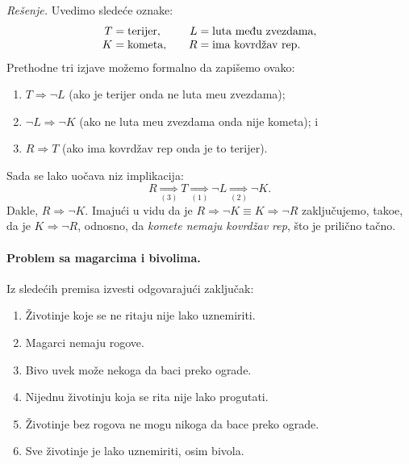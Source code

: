 \noindent
\textit{Re\v senje.}
Uvedimo slede\'ce oznake:
$$
  \begin{array}{r@{\;=\;}l@{\qquad}r@{\;=\;}l}
    T & \text{terijer}, & L & \text{luta me\dj u zvezdama},\\
    K & \text{kometa},  & R & \text{ima kovrd\v zav rep}.
  \end{array}
$$
Prethodne tri izjave mo\v zemo formalno da zapi\v semo ovako:
\begin{enumerate}
\item
  $T \Rightarrow \lnot L$ (ako je terijer onda ne luta me\dj u zvezdama);
\item
  $\lnot L \Rightarrow \lnot K$ (ako ne luta me\dj u zvezdama onda nije kometa); i
\item
  $R \Rightarrow T$ (ako ima kovrd\v zav rep onda je to terijer).
\end{enumerate}
Sada se lako uo\v cava niz implikacija:
$$
  R \underset{(3)}\Rightarrow T \underset{(1)}\Rightarrow \lnot L \underset{(2)}\Rightarrow \lnot K.
$$
Dakle, $R \Rightarrow \lnot K$. Imaju\'ci u vidu da je
$
  R \Rightarrow \lnot K \equiv K \Rightarrow \lnot R
$
zaklju\v cujemo, tako\dj e, da je $K \Rightarrow \lnot R$, odnosno, da
\emph{komete nemaju kovrd\v zav rep}, \v sto je prili\v cno ta\v cno.

\paragraph{Problem sa magarcima i bivolima.}
Iz slede\'cih premisa izvesti odgovaraju\'ci zaklju\v cak:
\begin{enumerate}
\item%
  \v Zivotinje koje se ne ritaju nije lako uznemiriti.
\item%
  Magarci nemaju rogove.
\item%
  Bivo uvek mo\v ze nekoga da baci preko ograde.
\item%
  Nijednu \v zivotinju koja se rita nije lako progutati.
\item%
  \v Zivotinje bez rogova ne mogu nikoga da bace preko ograde.
\item%
  Sve \v zivotinje je lako uznemiriti, osim bivola.
\end{enumerate}

